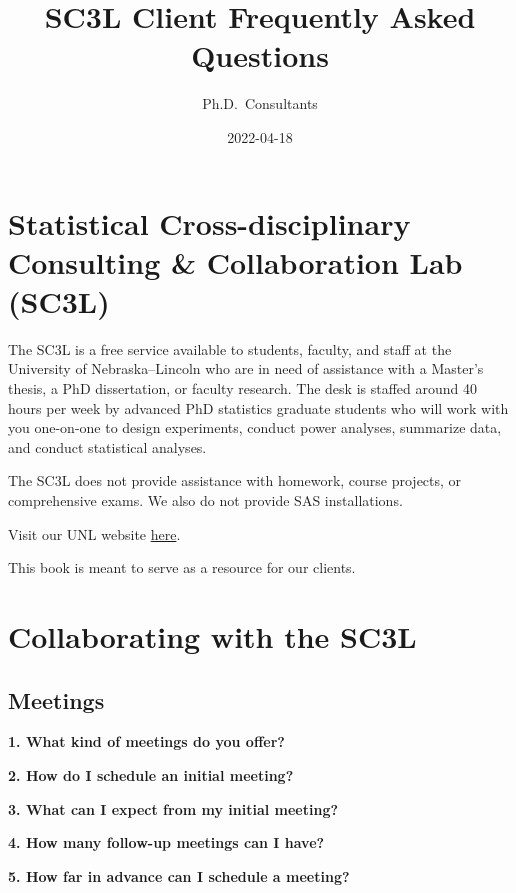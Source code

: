 \documentclass[
]{book}
\title{SC3L Client Frequently Asked Questions}
\author{Ph.D.~Consultants}
\date{2022-04-18}
\begin{document}
\maketitle

{
\setcounter{tocdepth}{1}
\tableofcontents
}
\hypertarget{statistical-cross-disciplinary-consulting-collaboration-lab-sc3l}{%
\chapter{Statistical Cross-disciplinary Consulting \& Collaboration Lab (SC3L)}\label{statistical-cross-disciplinary-consulting-collaboration-lab-sc3l}}

The SC3L is a free service available to students, faculty, and staff at the University of Nebraska--Lincoln who are in need of assistance with a Master's thesis, a PhD dissertation, or faculty research. The desk is staffed around 40 hours per week by advanced PhD statistics graduate students who will work with you one-on-one to design experiments, conduct power analyses, summarize data, and conduct statistical analyses.

The SC3L does not provide assistance with homework, course projects, or comprehensive exams. We also do not provide SAS installations.

Visit our UNL website \href{https://statistics.unl.edu/help-desk-form}{here}.

This book is meant to serve as a resource for our clients.

\hypertarget{collaborating-with-the-sc3l}{%
\chapter{Collaborating with the SC3L}\label{collaborating-with-the-sc3l}}

\hypertarget{meetings}{%
\section{Meetings}\label{meetings}}

\textbf{1. What kind of meetings do you offer?}

\textbf{2. How do I schedule an initial meeting?}

\textbf{3. What can I expect from my initial meeting?}

\textbf{4. How many follow-up meetings can I have?}

\textbf{5. How far in advance can I schedule a meeting?}
\end{document}
